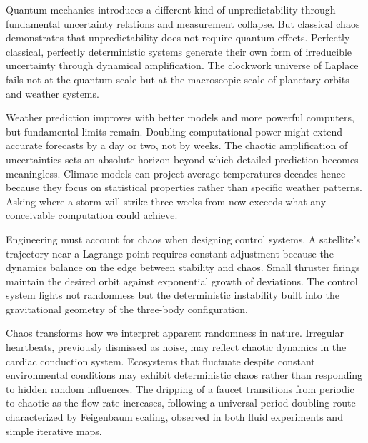 Quantum mechanics introduces a different kind of unpredictability through fundamental uncertainty relations and measurement collapse. But classical chaos demonstrates that unpredictability does not require quantum effects. Perfectly classical, perfectly deterministic systems generate their own form of irreducible uncertainty through dynamical amplification. The clockwork universe of Laplace fails not at the quantum scale but at the macroscopic scale of planetary orbits and weather systems.

Weather prediction improves with better models and more powerful computers, but fundamental limits remain. Doubling computational power might extend accurate forecasts by a day or two, not by weeks. The chaotic amplification of uncertainties sets an absolute horizon beyond which detailed prediction becomes meaningless. Climate models can project average temperatures decades hence because they focus on statistical properties rather than specific weather patterns. Asking where a storm will strike three weeks from now exceeds what any conceivable computation could achieve.

Engineering must account for chaos when designing control systems. A satellite's trajectory near a Lagrange point requires constant adjustment because the dynamics balance on the edge between stability and chaos. Small thruster firings maintain the desired orbit against exponential growth of deviations. The control system fights not randomness but the deterministic instability built into the gravitational geometry of the three-body configuration.

Chaos transforms how we interpret apparent randomness in nature. Irregular heartbeats, previously dismissed as noise, may reflect chaotic dynamics in the cardiac conduction system. Ecosystems that fluctuate despite constant environmental conditions may exhibit deterministic chaos rather than responding to hidden random influences. The dripping of a faucet transitions from periodic to chaotic as the flow rate increases, following a universal period-doubling route characterized by Feigenbaum scaling, observed in both fluid experiments and simple iterative maps.